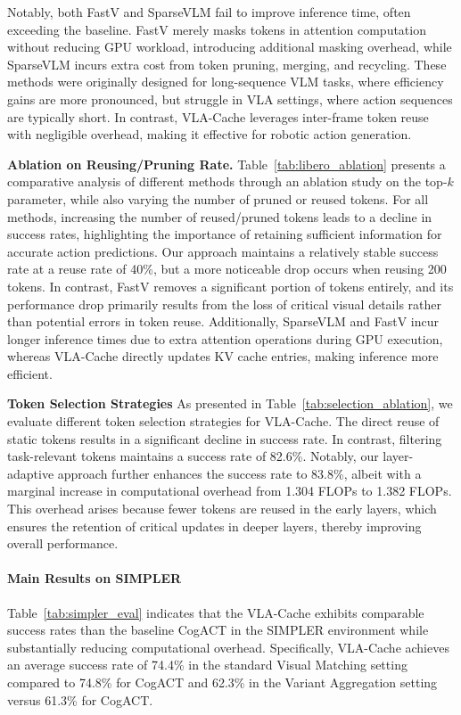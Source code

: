 Notably, both FastV and SparseVLM fail to improve inference time, often exceeding the baseline. FastV merely masks tokens in attention computation without reducing GPU workload, introducing additional masking overhead, while SparseVLM incurs extra cost from token pruning, merging, and recycling. These methods were originally designed for long-sequence VLM tasks, where efficiency gains are more pronounced, but struggle in VLA settings, where action sequences are typically short. In contrast, VLA-Cache leverages inter-frame token reuse with negligible overhead, making it effective for robotic action generation.


\textbf{Ablation on Reusing/Pruning Rate.}  
 Table~\ref{tab:libero_ablation} presents a comparative analysis of different methods through an ablation study on the top-$k$ parameter, while also varying the number of pruned or reused tokens. For all methods, increasing the number of reused/pruned tokens leads to a decline in success rates, highlighting the importance of retaining sufficient information for accurate action predictions. 
Our approach maintains a relatively stable success rate at a reuse rate of 40\%, but a more noticeable drop occurs when reusing 200 tokens. In contrast, FastV removes a significant portion of tokens entirely, and its performance drop primarily results from the loss of critical visual details rather than potential errors in token reuse. Additionally, SparseVLM and FastV incur longer inference times due to extra attention operations during GPU execution, whereas VLA-Cache directly updates KV cache entries, making inference more efficient.

\textbf{Token Selection Strategies} As presented in Table~\ref{tab:selection_ablation}, we evaluate different token selection strategies for VLA-Cache. The direct reuse of static tokens results in a significant decline in success rate. In contrast, filtering task-relevant tokens maintains a success rate of 82.6\%. Notably, our layer-adaptive approach further enhances the success rate to 83.8\%, albeit with a marginal increase in computational overhead from 1.304 FLOPs to 1.382 FLOPs. This overhead arises because fewer tokens are reused in the early layers, which ensures the retention of critical updates in deeper layers, thereby improving overall performance.


\paragraph{Main Results on SIMPLER}
Table~\ref{tab:simpler_eval} indicates that the VLA-Cache exhibits comparable success rates than the baseline CogACT in the SIMPLER environment while substantially reducing computational overhead. Specifically, VLA-Cache achieves an average success rate of 74.4\% in the standard Visual Matching setting compared to 74.8\% for CogACT and 62.3\% in the Variant Aggregation setting versus 61.3\% for CogACT. 

